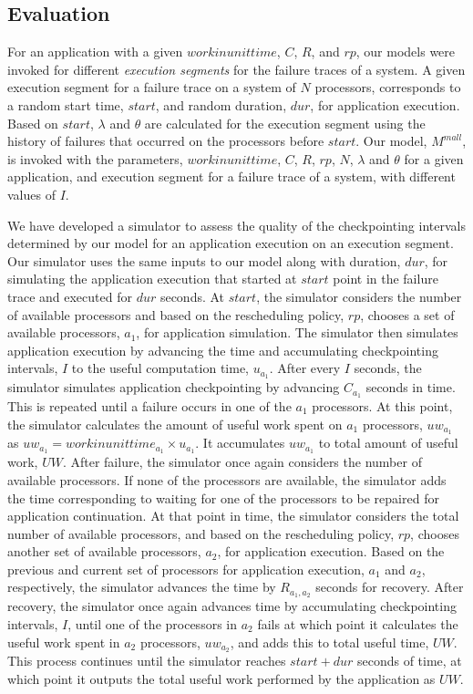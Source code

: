 \documentclass[conference,10pt]{IEEEtran}
\begin{document}
\subsection{Evaluation}

For an application with a given $workinunittime$, $C$, $R$, and $rp$,
our models were invoked for different {\em execution segments} for the
failure traces of a system. A given execution segment for a failure
trace on a system of $N$ processors, corresponds to
a random start time, $start$, and random duration, $dur$, for
application execution. Based on $start$, $\lambda$ and
$\theta$ are calculated for the execution segment using the history of
failures that occurred on the processors before $start$. Our model,
$M^{mall}$, is invoked with the parameters, $workinunittime$, $C$,
$R$, $rp$, $N$, $\lambda$ and $\theta$ for a given application, and
execution segment for a failure trace of a system, with different
values of $I$.

We have developed a simulator to assess the quality of the checkpointing
intervals determined by our model for an application execution on an
execution segment. Our simulator uses the same inputs
to our model along with duration, $dur$, for simulating the
application execution that started at $start$ point in the failure
trace and executed for $dur$ seconds. At $start$, the simulator
considers the number of available processors and based on the
rescheduling policy, $rp$, chooses a set of available processors,
$a_1$, for application simulation. The simulator then simulates
application execution by advancing the time and accumulating
checkpointing intervals, $I$ to the useful computation time,
$u_{a_1}$. After every $I$ seconds, the simulator simulates
application checkpointing by advancing $C_{a_1}$ seconds in time. This
is repeated until a failure occurs in one of the $a_1$ processors. At
this point, the simulator calculates the amount of useful work spent
on $a_1$ processors, $uw_{a_1}$ as $uw_{a_1} =
workinunittime_{a_1}\times u_{a_1}$. It accumulates $uw_{a_1}$ to
total amount of useful work, $UW$. After failure, the simulator once
again considers the number of available processors. If none of the
processors are available, the simulator adds the time corresponding to
waiting for one of the processors to be repaired for application
continuation. At that point in time, the simulator considers the total
number of available processors, and based on the rescheduling policy,
$rp$, chooses another set of available processors, $a_2$, for
application execution. Based on the previous and current set of
processors for application execution, $a_1$ and $a_2$, respectively,
the simulator advances the time by $R_{a_1,a_2}$ seconds for
recovery. After recovery, the simulator once again advances time by
accumulating checkpointing intervals, $I$, until one of the processors
in $a_2$ fails at which point it calculates the useful work spent in
$a_2$ processors, $uw_{a_2}$, and adds this to total useful time,
$UW$. This process continues until the simulator reaches $start+dur$
seconds of time, at which point it outputs the total useful work
performed by the application as $UW$.
\end{document}
